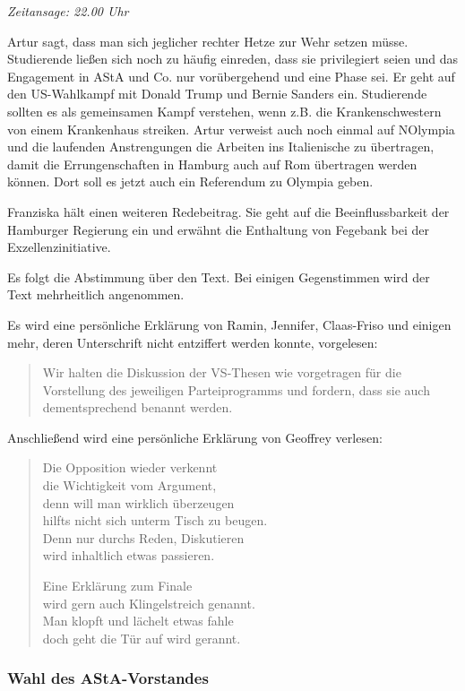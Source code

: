 \documentclass[ngerman,headheight=70pt]{scrartcl}
\begin{document}
    \textit{Zeitansage: 22.00 Uhr}

    Artur sagt, dass man sich jeglicher rechter Hetze zur Wehr setzen müsse.
    Studierende ließen sich noch zu häufig einreden, dass sie privilegiert
    seien und das Engagement in AStA und Co. nur vorübergehend und eine Phase
    sei. Er geht auf den US-Wahlkampf mit Donald Trump und Bernie Sanders ein.
    Studierende sollten es als gemeinsamen Kampf verstehen, wenn z.B. die
    Krankenschwestern von einem Krankenhaus streiken.
    Artur verweist auch noch einmal auf NOlympia und die laufenden Anstrengungen
    die Arbeiten ins Italienische zu übertragen, damit die Errungenschaften
    in Hamburg auch auf Rom übertragen werden können. Dort soll es jetzt auch
    ein Referendum zu Olympia geben.

    Franziska hält einen weiteren Redebeitrag. Sie geht auf die Beeinflussbarkeit
    der Hamburger Regierung ein und erwähnt die Enthaltung von Fegebank
    bei der Exzellenzinitiative.

    Es folgt die Abstimmung über den Text. Bei einigen Gegenstimmen wird der
    Text mehrheitlich angenommen.

    Es wird eine persönliche Erklärung von Ramin, Jennifer, Claas-Friso
    und einigen mehr, deren Unterschrift nicht entziffert werden konnte, vorgelesen:

    \blockquote{Wir halten die Diskussion der VS-Thesen wie vorgetragen für die
    Vorstellung des jeweiligen Parteiprogramms und fordern, dass sie auch dementsprechend
    benannt werden.}

    Anschließend wird eine persönliche Erklärung von Geoffrey verlesen:
    \blockquote{Die Opposition wieder verkennt\\
    die Wichtigkeit vom Argument,\\
    denn will man wirklich überzeugen\\
    hilfts nicht sich unterm Tisch zu beugen.\\
    Denn nur durchs Reden, Diskutieren\\
    wird inhaltlich etwas passieren.

    Eine Erklärung zum Finale\\
    wird gern auch Klingelstreich genannt.\\
    Man klopft und lächelt etwas fahle\\
    doch geht die Tür auf wird gerannt.}

    \subsubsection{Wahl des AStA-Vorstandes}
\end{document}
